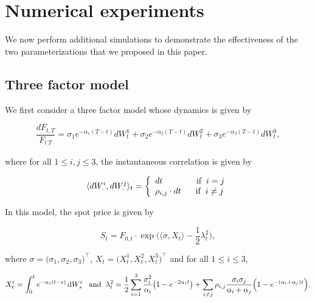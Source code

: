 \documentclass{article}
\numberwithin{equation}{section}
\begin{document}
\section{Numerical experiments}
\label{sec5}

\indent

We now perform additional simulations to demonstrate the effectiveness of the two parameterizations that we proposed in this paper.


\subsection{Three factor model}

\indent

We first consider a three factor model whose dynamics is given by

\begin{equation}
	\label{3fac_diff}
	\frac{dF_{t, T}}{F_{t_, T}} = \sigma_1 e^{-\alpha_1 (T-t)}dW_t^1 + \sigma_2 e^{-\alpha_2 (T-t)}dW_t^2 + \sigma_3 e^{-\alpha_3 (T-t)}dW_t^3 ,
\end{equation}

\noindent
where for all $1 \le i, j \le 3$, the instantaneous correlation is given by

\begin{equation*}
\langle dW_{\cdot}^i,dW_{\cdot}^j \rangle_t =  \left\{
    \begin{array}{ll}
        dt \hspace{1.4cm} \text{if} \hspace{0.2cm} i = j\\
        \rho_{i, j} \cdot dt \hspace{0.6cm} \text{if} \hspace{0.2cm} i \neq j
    \end{array}
\right.
\end{equation*}

\noindent
In this model, the spot price is given by

\begin{equation*}
S_t = F_{0,t} \cdot \exp\Big(\langle \sigma, X_t \rangle - \frac{1}{2}\lambda_t^2\Big),
\end{equation*}

\noindent
where $\sigma = \big(\sigma_1, \sigma_2, \sigma_3)^\top$, $X_t = \big( X_t^1, X_t^2, X_t^3 \big)^\top $ and for all $1 \le i \le 3$,

\begin{equation*}
X_t^i = \int_{0}^{t} e^{-\alpha_i (t-s)}\, \mathrm{d}W_s^i \hspace{0.3cm} \text{and} \hspace{0.2cm} \lambda_t^2 = \frac{1}{2} \sum_{i = 1}^{3} \frac{\sigma_i^2}{\alpha_i}\big(1-e^{-2\alpha_i t}\big) +  \sum_{i \neq j} \rho_{i, j} \frac{\sigma_i \sigma_j}{\alpha_i + \alpha_j} \Big(1 - e^{-(\alpha_i + \alpha_j)t}  \Big).
\end{equation*}
\end{document}
